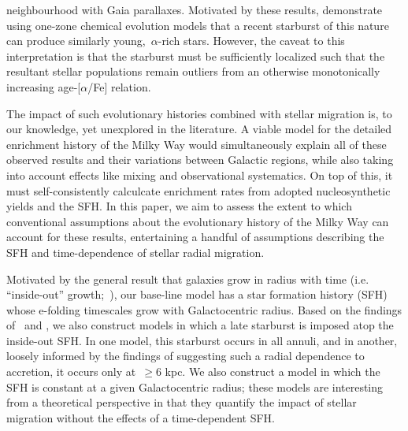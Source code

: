 \documentclass[fleqn, usenatbib]{mnras}
\begin{document}
neighbourhood with Gaia parallaxes. Motivated by these results, 
\citet{Johnson2020} demonstrate using one-zone chemical evolution models that 
a recent starburst of this nature can produce similarly young,~$\alpha$-rich 
stars. However, the caveat to this interpretation is that the starburst must be 
sufficiently localized such that the resultant stellar populations remain 
outliers from an otherwise monotonically increasing age-[$\alpha$/Fe] relation. 
\par 
The impact of such evolutionary histories combined with stellar migration is, 
to our knowledge, yet unexplored in the literature. A viable model for the 
detailed enrichment history of the Milky Way would simultaneously explain all 
of these observed results and their variations between Galactic regions, while 
also taking into account effects like mixing and observational systematics. On 
top of this, it must self-consistently calculcate enrichment rates from adopted 
nucleosynthetic yields and the SFH. In this paper, we aim to 
assess the extent to which conventional assumptions about the evolutionary 
history of the Milky Way can account for these results, entertaining a 
handful of assumptions describing the SFH and time-dependence of stellar 
radial migration. 
\par 
Motivated by the general result that galaxies grow in radius with time 
(i.e. ``inside-out'' growth;~\citealp{Bird2013}), our base-line model has a 
star formation history (SFH) whose e-folding timescales grow with 
Galactocentric radius. Based on the findings of~\citet{Mor2019} and 
\citet{Isern2019}, we also construct models in which a late starburst is 
imposed atop the inside-out SFH. In one model, this starburst occurs in all 
annuli, and in another, loosely informed by the findings of 
\citet{Vincenzo2020} suggesting such a radial dependence to accretion, it 
occurs only at~$\geq$6 kpc. We also construct a model in which the SFH is 
constant at a given Galactocentric radius; these models are interesting from a 
theoretical perspective in that they quantify the impact of stellar migration 
without the effects of a time-dependent SFH. 
\end{document}
